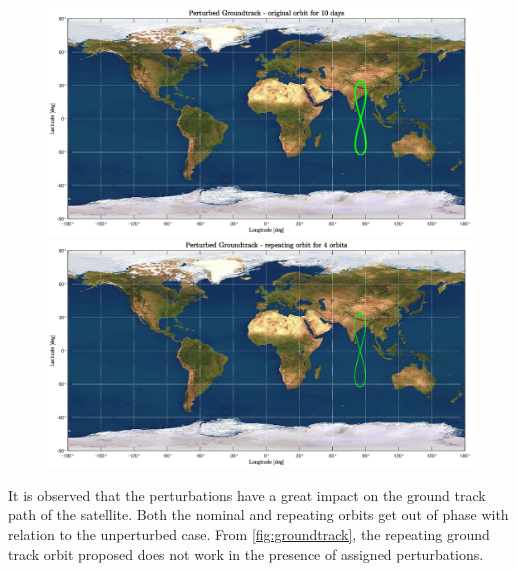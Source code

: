 \begin{figure}[H]
	\begin{minipage}{0.48\linewidth}
		\centering
		\includegraphics[width=\linewidth]{pg10d.eps}
	\end{minipage}\hfill
	\begin{minipage}{0.48\linewidth}
		\centering
		\includegraphics[width=\linewidth]{pgro4orb.eps}
	\end{minipage}
\end{figure}


It is observed that the perturbations have a great impact on the ground track path of the satellite. Both the nominal and repeating orbits get out of phase with relation to the unperturbed case. From \autoref{fig:groundtrack}, the repeating ground track orbit proposed does not work in the presence of assigned perturbations.